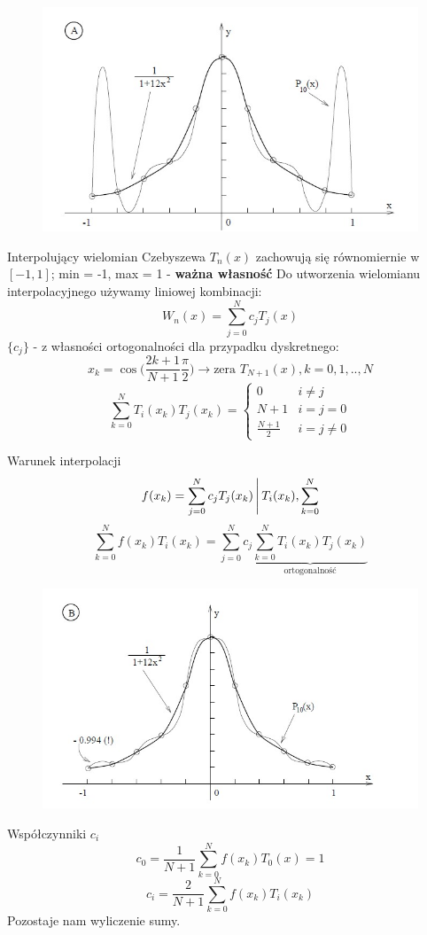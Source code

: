 \begin{frame}
	\begin{figure}
		\includegraphics[height=0.8\textheight]{img/5/czebyszew.jpg}
	\end{figure}
\end{frame}
\begin{frame}{Interpolujący wielomian Czebyszewa}
	$T_n(x)$ zachowują się równomiernie w $[-1,1]$; min = -1, max = 1 - \textbf{ważna własność} \newline
    Do utworzenia wielomianu interpolacyjnego używamy liniowej kombinacji:
    $$W_n(x) = \sum_{j=0}^{N}c_jT_j(x)$$
    $\{c_j\}$ - z własności ortogonalności dla przypadku dyskretnego:
    $$x_k=\cos\Big(\frac{2k+1}{N+1}\frac{\pi}{2}\Big)\rightarrow \text{zera } T_{N+1}(x),k=0,1,..,N$$
    $$\sum_{k=0}^{N}T_i(x_k)T_j(x_k) = \left\{\begin{array}{cc}
    	0 & i \not= j \\
        N+1 & i=j=0 \\
        \frac{N+1}{2} & i=j\not=0
    \end{array}\right.$$
\end{frame}
\begin{frame}{Warunek interpolacji}
	$$f(x_k)= \sum_{j=0}^{N}c_jT_j(x_k)\Bigg\arrowvert T_i(x_k),\sum_{k=0}^{N}$$
    $$\sum_{k=0}^{N}f(x_k)T_i(x_k)=\sum_{j=0}^{N}c_j\underbrace{\sum_{k=0}^{N}T_i(x_k)T_j(x_k)}_{\text{ortogonalność}}$$
\end{frame}
\begin{frame}
	\begin{figure}
		\includegraphics[height=0.8\textheight]{img/5/interpolacja.jpg}
	\end{figure}
\end{frame}
\begin{frame}{Współczynniki $c_i$}
	$$c_0 = \frac{1}{N+1}\sum_{k=0}^{N}f(x_k)T_0(x)=1$$
    $$c_i = \frac{2}{N+1}\sum_{k=0}^{N}f(x_k)T_i(x_k)$$
    Pozostaje nam wyliczenie sumy.
\end{frame}
